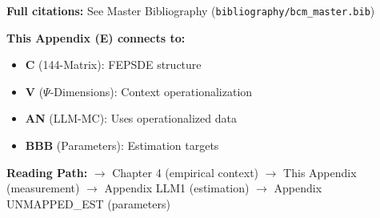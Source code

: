 \textbf{Full citations:} See Master Bibliography (\texttt{bibliography/bcm\_master.bib})


\begin{tcolorbox}[colback=gray!10!white, colframe=gray!75!black,
    title=\textbf{Cross-Reference Footer}]
\label{sec:E-footer}

\textbf{This Appendix (E) connects to:}
\begin{itemize}[nosep]
    \item \textbf{C} (144-Matrix): FEPSDE structure
    \item \textbf{V} ($\Psi$-Dimensions): Context operationalization
    \item \textbf{AN} (LLM-MC): Uses operationalized data
    \item \textbf{BBB} (Parameters): Estimation targets
\end{itemize}

\textbf{Reading Path:}
$\rightarrow$ Chapter 4 (empirical context) $\rightarrow$ This Appendix (measurement)
$\rightarrow$ Appendix LLM1 (estimation) $\rightarrow$ Appendix UNMAPPED_EST (parameters)

\end{tcolorbox}

